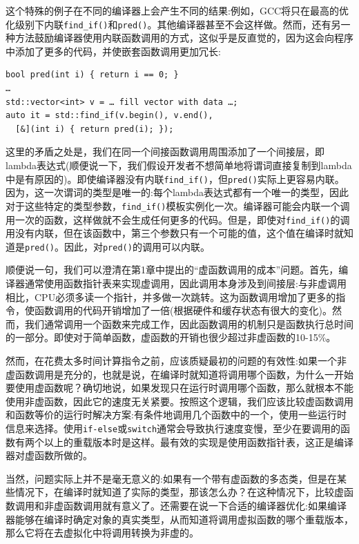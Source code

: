 这个特殊的例子在不同的编译器上会产生不同的结果:例如，GCC将只在最高的优化级别下内联\texttt{find\_if()}和\texttt{pred()}。其他编译器甚至不会这样做。然而，还有另一种方法鼓励编译器使用内联函数调用的方式，这似乎是反直觉的，因为这会向程序中添加了更多的代码，并使嵌套函数调用更加冗长:

\begin{lstlisting}[style=styleCXX]
bool pred(int i) { return i == 0; }
… 
std::vector<int> v = … fill vector with data …;
auto it = std::find_if(v.begin(), v.end(), 
  [&](int i) { return pred(i); });
\end{lstlisting}

这里的矛盾之处是，我们在同一个间接函数调用周围添加了一个间接层，即lambda表达式(顺便说一下，我们假设开发者不想简单地将谓词直接复制到lambda中是有原因的)。即使编译器没有内联\texttt{find\_if()}，但\texttt{pred()}实际上更容易内联。因为，这一次谓词的类型是唯一的:每个lambda表达式都有一个唯一的类型，因此对于这些特定的类型参数，\texttt{find\_if()}模板实例化一次。编译器可能会内联一个调用一次的函数，这样做就不会生成任何更多的代码。但是，即使对\texttt{find\_if()}的调用没有内联，但在该函数中，第三个参数只有一个可能的值，这个值在编译时就知道是\texttt{pred()}。因此，对\texttt{pred()}的调用可以内联。

顺便说一句，我们可以澄清在第1章中提出的“虚函数调用的成本”问题。首先，编译器通常使用函数指针表来实现虚调用，因此调用本身涉及到间接层:与非虚调用相比，CPU必须多读一个指针，并多做一次跳转。这为函数调用增加了更多的指令，使函数调用的代码开销增加了一倍(根据硬件和缓存状态有很大的变化)。然而，我们通常调用一个函数来完成工作，因此函数调用的机制只是函数执行总时间的一部分。即使对于简单函数，虚函数的开销也很少超过非虚函数的10-15\%。

然而，在花费太多时间计算指令之前，应该质疑最初的问题的有效性:如果一个非虚函数调用是充分的，也就是说，在编译时就知道将调用哪个函数，为什么一开始要使用虚函数呢？确切地说，如果发现只在运行时调用哪个函数，那么就根本不能使用非虚函数，因此它的速度无关紧要。按照这个逻辑，我们应该比较虚函数调用和函数等价的运行时解决方案:有条件地调用几个函数中的一个，使用一些运行时信息来选择。使用\texttt{if-else}或\texttt{switch}通常会导致执行速度变慢，至少在要调用的函数有两个以上的重载版本时是这样。最有效的实现是使用函数指针表，这正是编译器对虚函数所做的。

当然，问题实际上并不是毫无意义的:如果有一个带有虚函数的多态类，但是在某些情况下，在编译时就知道了实际的类型，那该怎么办？在这种情况下，比较虚函数调用和非虚函数调用就有意义了。还需要在说一下合适的编译器优化:如果编译器能够在编译时确定对象的真实类型，从而知道将调用虚拟函数的哪个重载版本，那么它将在去虚拟化中将调用转换为非虚的。

